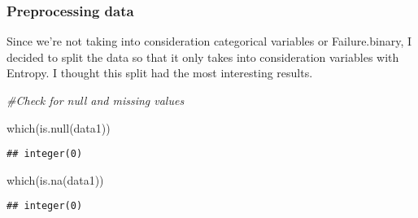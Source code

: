 \documentclass[
]{article}
\newenvironment{Shaded}{\begin{snugshade}}{\end{snugshade}}
\newcommand{\AttributeTok}[1]{\textcolor[rgb]{0.77,0.63,0.00}{#1}}
\newcommand{\CommentTok}[1]{\textcolor[rgb]{0.56,0.35,0.01}{\textit{#1}}}
\newcommand{\FunctionTok}[1]{\textcolor[rgb]{0.00,0.00,0.00}{#1}}
\newcommand{\NormalTok}[1]{#1}
\newcommand{\OtherTok}[1]{\textcolor[rgb]{0.56,0.35,0.01}{#1}}
\newcommand{\SpecialCharTok}[1]{\textcolor[rgb]{0.00,0.00,0.00}{#1}}
\newcommand{\StringTok}[1]{\textcolor[rgb]{0.31,0.60,0.02}{#1}}
\begin{document}
\hypertarget{preprocessing-data}{%
\subsubsection{Preprocessing data}\label{preprocessing-data}}

Since we're not taking into consideration categorical variables or
Failure.binary, I decided to split the data so that it only takes into
consideration variables with Entropy. I thought this split had the most
interesting results.

\begin{Shaded}
\begin{Highlighting}[]
\CommentTok{\#Check for null and missing values}

\FunctionTok{which}\NormalTok{(}\FunctionTok{is.null}\NormalTok{(data1))}
\end{Highlighting}
\end{Shaded}

\begin{verbatim}
## integer(0)
\end{verbatim}

\begin{Shaded}
\begin{Highlighting}[]
\FunctionTok{which}\NormalTok{(}\FunctionTok{is.na}\NormalTok{(data1))}
\end{Highlighting}
\end{Shaded}

\begin{verbatim}
## integer(0)
\end{verbatim}

\begin{Shaded}
\end{Shaded}
\end{document}
